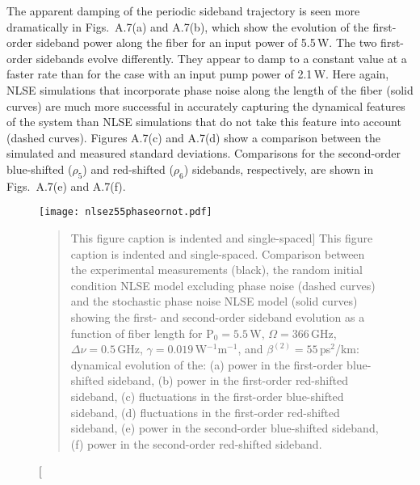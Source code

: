 The apparent damping of the periodic sideband trajectory is seen more
dramatically in Figs.\ A.7(a) and A.7(b), which show the evolution of the
first-order sideband power along the fiber for an input power of 5.5\,W.
The two first-order sidebands evolve differently. They appear to
damp to a constant value at a faster rate than for the case with an input pump
power of 2.1\,W. Here again, NLSE simulations that incorporate phase noise along the length
of the fiber (solid curves) are much more successful in accurately capturing the dynamical features of the system than NLSE simulations that do not take this feature into account (dashed curves).  Figures A.7(c) and A.7(d) show a comparison between the simulated and measured standard deviations. Comparisons for the second-order blue-shifted ($\rho_5$) and red-shifted ($\rho_6$) sidebands, respectively, are shown in Figs.\ A.7(e) and A.7(f).


\begin{figure}
\begin{center}
\texttt{[image: nlsez55phaseornot.pdf]}
\end{center}
\renewcommand{\baselinestretch}{1}
\small\normalsize
\begin{quote}
\caption
[This figure caption is indented and single-spaced]
{This figure caption is indented and single-spaced.  Comparison between the experimental measurements \cite{hart1} (black), the random initial condition NLSE model excluding phase noise (dashed curves) and the stochastic phase noise NLSE model (solid curves) showing the first- and second-order sideband evolution as a function of fiber length for P$_{0} = 5.5$\,W, $\Omega = 366$\,GHz, $\Delta\nu = 0.5$\,GHz, $\gamma = 0.019$\,W$^{-1}$m$^{-1}$, and $\beta^{(2)} = 55$\,ps$^2$/km: dynamical evolution of the: (a) power in the first-order blue-shifted sideband, (b) power in the first-order red-shifted sideband, (c) fluctuations in the first-order blue-shifted sideband, (d) fluctuations in the first-order red-shifted sideband, (e) power in the second-order blue-shifted sideband, (f) power in the second-order red-shifted sideband.}
\label{figA.7}
\end{quote}
\end{figure}
\renewcommand{\baselinestretch}{2}
\small\normalsize

